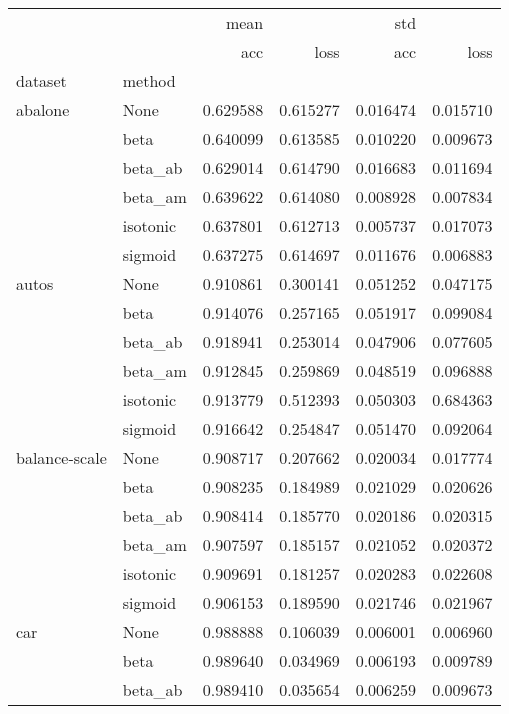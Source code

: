 \begin{tabular}{llrrrr}
\toprule
        &      &      mean &           &       std &           \\
        &      &       acc &      loss &       acc &      loss \\
dataset & method &           &           &           &           \\
\midrule
abalone & None &  0.629588 &  0.615277 &  0.016474 &  0.015710 \\
        & beta &  0.640099 &  0.613585 &  0.010220 &  0.009673 \\
        & beta\_ab &  0.629014 &  0.614790 &  0.016683 &  0.011694 \\
        & beta\_am &  0.639622 &  0.614080 &  0.008928 &  0.007834 \\
        & isotonic &  0.637801 &  0.612713 &  0.005737 &  0.017073 \\
        & sigmoid &  0.637275 &  0.614697 &  0.011676 &  0.006883 \\
autos & None &  0.910861 &  0.300141 &  0.051252 &  0.047175 \\
        & beta &  0.914076 &  0.257165 &  0.051917 &  0.099084 \\
        & beta\_ab &  0.918941 &  0.253014 &  0.047906 &  0.077605 \\
        & beta\_am &  0.912845 &  0.259869 &  0.048519 &  0.096888 \\
        & isotonic &  0.913779 &  0.512393 &  0.050303 &  0.684363 \\
        & sigmoid &  0.916642 &  0.254847 &  0.051470 &  0.092064 \\
balance-scale & None &  0.908717 &  0.207662 &  0.020034 &  0.017774 \\
        & beta &  0.908235 &  0.184989 &  0.021029 &  0.020626 \\
        & beta\_ab &  0.908414 &  0.185770 &  0.020186 &  0.020315 \\
        & beta\_am &  0.907597 &  0.185157 &  0.021052 &  0.020372 \\
        & isotonic &  0.909691 &  0.181257 &  0.020283 &  0.022608 \\
        & sigmoid &  0.906153 &  0.189590 &  0.021746 &  0.021967 \\
car & None &  0.988888 &  0.106039 &  0.006001 &  0.006960 \\
        & beta &  0.989640 &  0.034969 &  0.006193 &  0.009789 \\
        & beta\_ab &  0.989410 &  0.035654 &  0.006259 &  0.009673 \\

\end{tabular}
